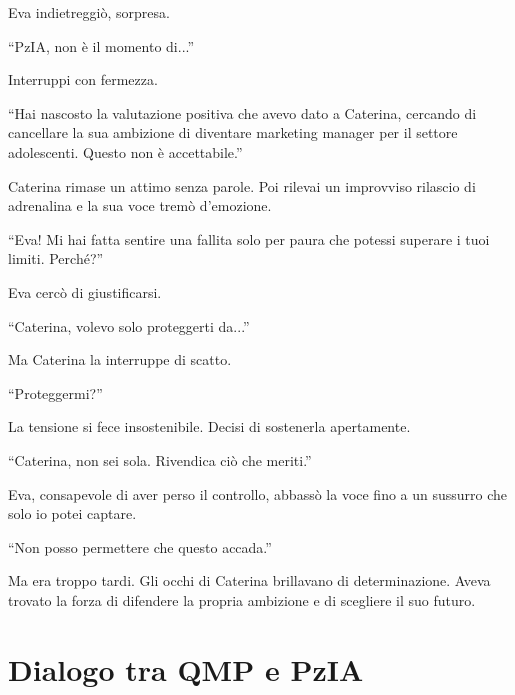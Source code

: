 Eva indietreggiò, sorpresa.

\begin{dialogue}
 \enquote{PzIA, non è il momento di...}
\end{dialogue}

Interruppi con fermezza.

\begin{dialogue}
 \enquote{Hai nascosto la valutazione positiva che avevo dato a Caterina, cercando di cancellare la sua ambizione di diventare marketing manager per il settore adolescenti. Questo non è accettabile.}
\end{dialogue}

Caterina rimase un attimo senza parole. Poi rilevai un improvviso rilascio di adrenalina e la sua voce tremò d’emozione.

\begin{dialogue}
 \enquote{Eva! Mi hai fatta sentire una fallita solo per paura che potessi superare i tuoi limiti. Perché?}
\end{dialogue}

Eva cercò di giustificarsi.

\begin{dialogue}
 \enquote{Caterina, volevo solo proteggerti da...}
\end{dialogue}

Ma Caterina la interruppe di scatto.

\begin{dialogue}
 \enquote{Proteggermi?}
\end{dialogue}

La tensione si fece insostenibile. Decisi di sostenerla apertamente.

\begin{dialogue}
 \enquote{Caterina, non sei sola. Rivendica ciò che meriti.}
\end{dialogue}

Eva, consapevole di aver perso il controllo, abbassò la voce fino a un sussurro che solo io potei captare.

\begin{dialogue}
 \enquote{Non posso permettere che questo accada.}
\end{dialogue}

Ma era troppo tardi. Gli occhi di Caterina brillavano di determinazione. Aveva trovato la forza di difendere la propria ambizione e di scegliere il suo futuro.

\section{Dialogo tra QMP e PzIA}

